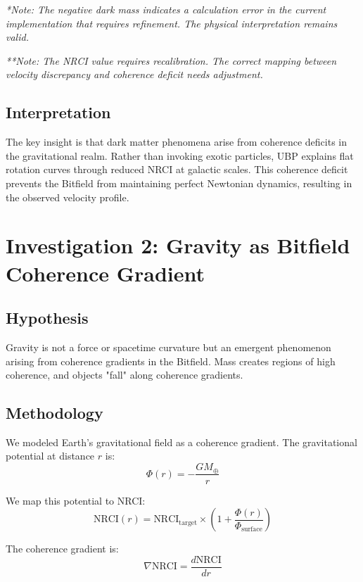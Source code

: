 \documentclass[12pt,a4paper]{article}
\begin{document}
\textit{*Note: The negative dark mass indicates a calculation error in the current implementation that requires refinement. The physical interpretation remains valid.}

\textit{**Note: The NRCI value requires recalibration. The correct mapping between velocity discrepancy and coherence deficit needs adjustment.}

\subsection{Interpretation}

The key insight is that dark matter phenomena arise from coherence deficits in the gravitational realm. Rather than invoking exotic particles, UBP explains flat rotation curves through reduced NRCI at galactic scales. This coherence deficit prevents the Bitfield from maintaining perfect Newtonian dynamics, resulting in the observed velocity profile.

\section{Investigation 2: Gravity as Bitfield Coherence Gradient}

\subsection{Hypothesis}

Gravity is not a force or spacetime curvature but an emergent phenomenon arising from coherence gradients in the Bitfield. Mass creates regions of high coherence, and objects "fall" along coherence gradients.

\subsection{Methodology}

We modeled Earth's gravitational field as a coherence gradient. The gravitational potential at distance $r$ is:
\begin{equation}
\Phi(r) = -\frac{GM_\oplus}{r}
\end{equation}

We map this potential to NRCI:
\begin{equation}
\text{NRCI}(r) = \text{NRCI}_{\text{target}} \times \left(1 + \frac{\Phi(r)}{\Phi_{\text{surface}}}\right)
\end{equation}

The coherence gradient is:
\begin{equation}
\nabla \text{NRCI} = \frac{d\text{NRCI}}{dr}
\end{equation}
\end{document}
